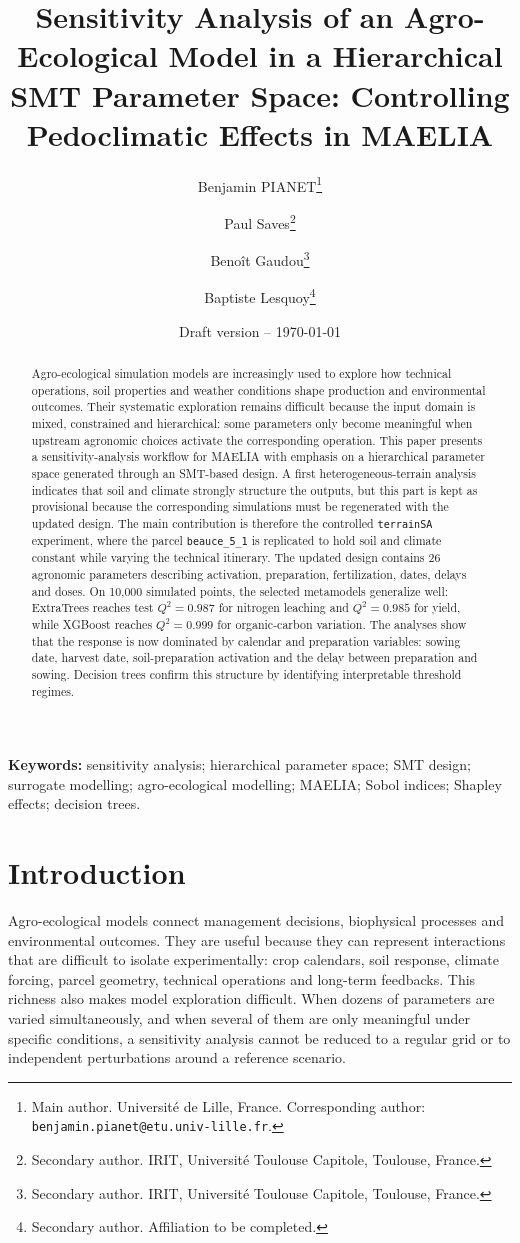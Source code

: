 \documentclass[11pt,a4paper]{article}
\title{Sensitivity Analysis of an Agro-Ecological Model in a Hierarchical SMT Parameter Space: Controlling Pedoclimatic Effects in MAELIA}
\author{
Benjamin PIANET\thanks{Main author. Université de Lille, France. Corresponding author: \texttt{benjamin.pianet@etu.univ-lille.fr}.}
\and Paul Saves\thanks{Secondary author. IRIT, Université Toulouse Capitole, Toulouse, France.}
\and Benoît Gaudou\thanks{Secondary author. IRIT, Université Toulouse Capitole, Toulouse, France.}
\and Baptiste Lesquoy\thanks{Secondary author. Affiliation to be completed.}
}
\date{Draft version -- \today}
\begin{document}
\maketitle

\begin{abstract}
Agro-ecological simulation models are increasingly used to explore how technical operations, soil properties and weather conditions shape production and environmental outcomes. Their systematic exploration remains difficult because the input domain is mixed, constrained and hierarchical: some parameters only become meaningful when upstream agronomic choices activate the corresponding operation. This paper presents a sensitivity-analysis workflow for MAELIA with emphasis on a hierarchical parameter space generated through an SMT-based design. A first heterogeneous-terrain analysis indicates that soil and climate strongly structure the outputs, but this part is kept as provisional because the corresponding simulations must be regenerated with the updated design. The main contribution is therefore the controlled \texttt{terrainSA} experiment, where the parcel \texttt{beauce\_5\_1} is replicated to hold soil and climate constant while varying the technical itinerary. The updated design contains 26 agronomic parameters describing activation, preparation, fertilization, dates, delays and doses. On 10,000 simulated points, the selected metamodels generalize well: ExtraTrees reaches test $Q^2=0.987$ for nitrogen leaching and $Q^2=0.985$ for yield, while XGBoost reaches $Q^2=0.999$ for organic-carbon variation. The analyses show that the response is now dominated by calendar and preparation variables: sowing date, harvest date, soil-preparation activation and the delay between preparation and sowing. Decision trees confirm this structure by identifying interpretable threshold regimes.
\end{abstract}

\noindent\textbf{Keywords:} sensitivity analysis; hierarchical parameter space; SMT design; surrogate modelling; agro-ecological modelling; MAELIA; Sobol indices; Shapley effects; decision trees.

\section{Introduction}

Agro-ecological models connect management decisions, biophysical processes and environmental outcomes. They are useful because they can represent interactions that are difficult to isolate experimentally: crop calendars, soil response, climate forcing, parcel geometry, technical operations and long-term feedbacks. This richness also makes model exploration difficult. When dozens of parameters are varied simultaneously, and when several of them are only meaningful under specific conditions, a sensitivity analysis cannot be reduced to a regular grid or to independent perturbations around a reference scenario.
\end{document}
